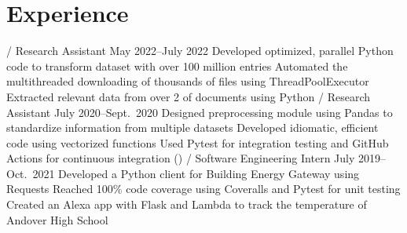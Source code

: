 \section{Experience}
\begin{doutline}
     / Research Assistant
    \hfill May 2022--July 2022
        \2 Developed optimized, parallel Python code to transform dataset with over 100 million entries
        \2 Automated the multithreaded downloading of thousands of files using ThreadPoolExecutor
        \2 Extracted relevant data from over 2  of   documents using Python
     / Research Assistant
    \hfill July 2020--Sept.\ 2020
        \2 Designed preprocessing module using Pandas to standardize information from multiple datasets
            \3 Developed idiomatic, efficient code using vectorized functions
            \3 Used Pytest for integration testing and GitHub Actions for continuous integration ()
     / Software Engineering Intern
    \hfill July 2019--Oct.\ 2021
        \2 Developed a Python client for Building Energy Gateway using Requests
            \3 Reached 100\% code coverage using Coveralls and Pytest for unit testing
        \2 Created an Alexa app with Flask and  Lambda to track the temperature of Andover High School
\end{doutline}

